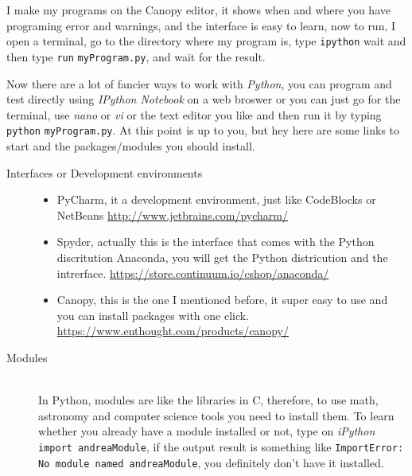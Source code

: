 \documentclass[11pt,fleqn]{book} %
\begin{document}
\begin{description}
    I make my programs on the Canopy editor, it shows when and where you have programing error and warnings, and the interface is easy to learn, now to run, I open a terminal, go to the directory where my program is, type \verb|ipython| wait and then type \verb|run| \verb|myProgram.py|, and wait for the result.
    
    Now there are a lot of fancier ways to work with \emph{Python}, you can program and test directly using \emph{IPython Notebook} on a web broswer or you can just go for the terminal, use \emph{nano} or \emph{vi} or the text editor you like and then run it by typing \verb|python| \verb|myProgram.py|. At this point is up to you, but hey here are some links to start and the packages/modules you should install.
    
    \begin{description}
    	\item[Interfaces or Development environments]\hfill
        	\begin{itemize}
            	\item PyCharm, it a development environment, just like CodeBlocks or NetBeans \url{http://www.jetbrains.com/pycharm/}
                \item Spyder, actually this is the interface that comes with the Python discritution Anaconda, you will get the Python districution and the intrerface. \url{https://store.continuum.io/cshop/anaconda/}
                \item Canopy, this is the one I mentioned before, it super easy to use and you can install packages with one click. \url{https://www.enthought.com/products/canopy/}
            \end{itemize}
        \item[Modules]\hfill
        \\
        In Python, modules are like the libraries in C, therefore, to use math, astronomy and computer science tools you need to install them. To learn whether you already have a module installed or not, type on \emph{iPython} \verb|import andreaModule|, if the output result is something like \verb|ImportError: No module named andreaModule|, you definitely don't have it installed. 
        

\end{description}
\end{description}
\end{document}
